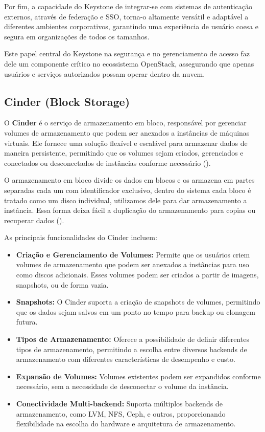 Por fim, a capacidade do Keystone de integrar-se com sistemas de autenticação externos, através de federação e SSO, torna-o altamente versátil e adaptável a diferentes ambientes corporativos, garantindo uma experiência de usuário coesa e segura em organizações de todos os tamanhos.

Este papel central do Keystone na segurança e no gerenciamento de acesso faz dele um componente crítico no ecossistema OpenStack, assegurando que apenas usuários e serviços autorizados possam operar dentro da nuvem.


\subsection{Cinder (Block Storage)}

O \textbf{Cinder} é o serviço de armazenamento em bloco, responsável por gerenciar volumes de armazenamento que podem ser anexados a instâncias de máquinas virtuais. Ele fornece uma solução flexível e escalável para armazenar dados de maneira persistente, permitindo que os volumes sejam criados, gerenciados e conectados ou desconectados de instâncias conforme necessário (\cite{rosado2014overview}).

O armazenamento em bloco divide os dados em blocos e os armazena em partes separadas cada um com identificador exclusivo, dentro do sistema cada bloco é tratado como um disco individual, utilizamos dele para dar armazenamento a instância. Essa forma deixa fácil a duplicação do armazenamento para copias ou recuperar dados (\cite{BlockStorage}).

As principais funcionalidades do Cinder incluem:

\begin{itemize}
    \item \textbf{Criação e Gerenciamento de Volumes:} Permite que os usuários criem volumes de armazenamento que podem ser anexados a instâncias para uso como discos adicionais. Esses volumes podem ser criados a partir de imagens, snapshots, ou de forma vazia.
    \item \textbf{Snapshots:} O Cinder suporta a criação de snapshots de volumes, permitindo que os dados sejam salvos em um ponto no tempo para backup ou clonagem futura.
    \item \textbf{Tipos de Armazenamento:} Oferece a possibilidade de definir diferentes tipos de armazenamento, permitindo a escolha entre diversos backends de armazenamento com diferentes características de desempenho e custo.
    \item \textbf{Expansão de Volumes:} Volumes existentes podem ser expandidos conforme necessário, sem a necessidade de desconectar o volume da instância.
    \item \textbf{Conectividade Multi-backend:} Suporta múltiplos backends de armazenamento, como LVM, NFS, Ceph, e outros, proporcionando flexibilidade na escolha do hardware e arquitetura de armazenamento.
\end{itemize}

